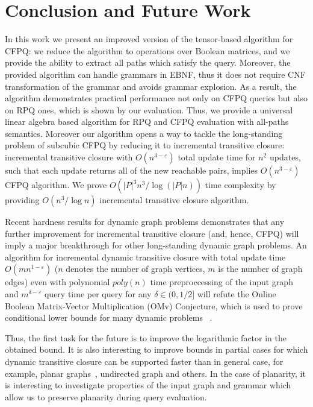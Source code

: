 \section{Conclusion and Future Work}

In this work we present an improved version of the tensor-based algorithm for CFPQ: we reduce the algorithm to operations over Boolean matrices, and we provide the ability to extract all paths which satisfy the query.
Moreover, the provided algorithm can handle grammars in EBNF, thus it does not require CNF transformation of the grammar and avoids grammar explosion.
As a result, the algorithm demonstrates practical performance not only on CFPQ queries but also on RPQ ones, which is shown by our evaluation.
Thus, we provide a universal linear algebra based algorithm for RPQ and CFPQ evaluation with all-paths semantics.
Moreover our algorithm opens a way to tackle the long-standing problem of subcubic CFPQ by reducing it to incremental transitive closure: incremental transitive closure with $O(n^{3-\varepsilon})$ total update time for $n^2$ updates, such that each update returns all of the new reachable pairs, implies $O(n^{3-\varepsilon})$ CFPQ algorithm. We prove $O({|P|}^3n^3/\log (|P|n))$ time complexity by providing $O(n^3/\log{n})$ incremental transitive closure algorithm. 


Recent hardness results for dynamic graph problems demonstrates that any further improvement for incremental transitive closure (and, hence, CFPQ) will imply a major breakthrough for other long-standing dynamic graph problems. An algorithm for incremental dynamic transitive closure with total update time $O(mn^{1-\varepsilon})$ ($n$ denotes the number of graph vertices, $m$ is the number of graph edges) even with polynomial $poly(n)$ time preproccessing of the input graph and $m^{\delta - \varepsilon}$ query time per query for any $\delta \in (0, 1/2]$ will refute the Online Boolean Matrix-Vector Multiplication (OMv) Conjecture, which is used to prove conditional lower bounds for many dynamic problems ~\citep{8948597, 10.1145/2746539.2746609}.


Thus, the first task for the future is to improve the logarithmic factor in the obtained bound.
It is also interesting to improve bounds in partial cases for which dynamic transitive closure can be supported faster than in general case, for example, planar graphs~\citep{10.1007/3-540-57273-2_72}, undirected graph and others.
In the case of planarity, it is interesting to investigate properties of the input graph and grammar which allow us to preserve planarity during query evaluation.


